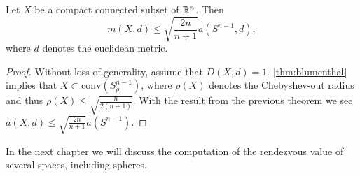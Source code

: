 \begin{theorem}
	Let $X$ be a compact connected subset of $\mathbb{R}^n$. Then 
	\[m(X,d)\leq \sqrt{\frac{2n}{n+1}}a(S^{n-1},d),\]
	where $d$ denotes the euclidean metric.
\end{theorem}

\begin{proof}
	Without loss of generality, assume that $D(X,d)=1$. \autoref{thm:blumenthal} implies that $X\subset \mathrm{conv}(S^{n-1}_{\rho})$, where $\rho(X)$ denotes the Chebyshev-out radius and thus $\rho(X)\leq \sqrt{\frac{n}{2(n+1)}}$. With the result from the previous theorem we see
	$a(X,d)\leq\sqrt{\frac{2n}{n+1}}a(S^{n-1})$.
\end{proof}
In the next chapter we will discuss the computation of the rendezvous value of several spaces, including spheres.